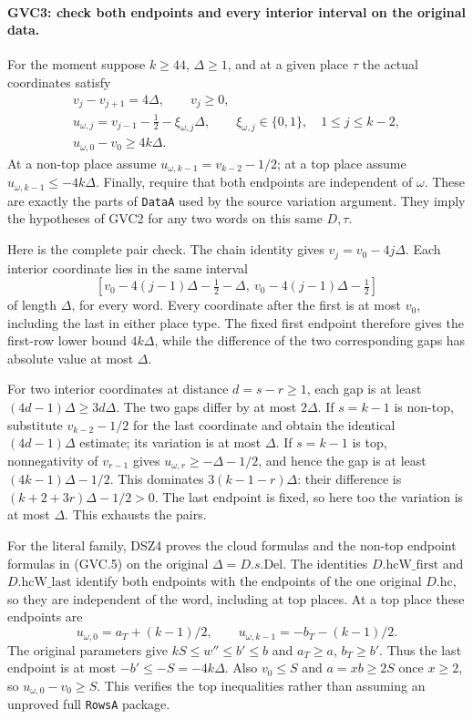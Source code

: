 \paragraph{GVC3: check both endpoints and every interior interval on the original data.}
\label{claim:GVC3}
For the moment suppose $k\ge44$, $\Delta\ge1$, and at a given
place $\tau$ the actual coordinates satisfy
\[
 \begin{gathered}
 v_j-v_{j+1}=4\Delta,\qquad v_j\ge0,\\
 u_{\omega,j}=v_{j-1}-\tfrac12-\xi_{\omega,j}\Delta,
 \qquad \xi_{\omega,j}\in\{0,1\},\quad1\le j\le k-2,\\
 u_{\omega,0}-v_0\ge4k\Delta.
 \end{gathered}                                               \tag{GVC.5}
\]
At a non-top place assume
$u_{\omega,k-1}=v_{k-2}-1/2$; at a top place assume
$u_{\omega,k-1}\le-4k\Delta$.
Finally, require that both endpoints are independent of $\omega$.
These are exactly the parts of \texttt{DataA} used by the source
variation argument. They imply the hypotheses of GVC2 for any two
words on this same $D,\tau$.

Here is the complete pair check. The chain identity gives
$v_j=v_0-4j\Delta$. Each interior coordinate lies in the same
interval
\[
 [v_0-4(j-1)\Delta-\tfrac12-\Delta,\
   v_0-4(j-1)\Delta-\tfrac12]
\]
of length $\Delta$, for every word. Every coordinate after the
first is at most $v_0$, including the last in either place type.
The fixed first endpoint therefore gives the first-row lower bound
$4k\Delta$, while the difference of the two corresponding gaps
has absolute value at most $\Delta$.

For two interior coordinates at distance $d=s-r\ge1$, each gap
is at least $(4d-1)\Delta\ge3d\Delta$.
The two gaps differ by at most $2\Delta$.
If $s=k-1$ is non-top, substitute
$v_{k-2}-1/2$ for the last coordinate and obtain the identical
$(4d-1)\Delta$ estimate; its variation is at most $\Delta$.
If $s=k-1$ is top, nonnegativity of $v_{r-1}$ gives
$u_{\omega,r}\ge-\Delta-1/2$, and hence the gap is at least
$(4k-1)\Delta-1/2$. This dominates
$3(k-1-r)\Delta$: their difference is
$(k+2+3r)\Delta-1/2>0$.
The last endpoint is fixed, so here too the variation is at most
$\Delta$. This exhausts the pairs.

For the literal family, DSZ4 proves the cloud formulas and the
non-top endpoint formulas in (GVC.5) on the original
$\Delta=D.s.\mathrm{Del}$. The identities
$D.\mathrm{hcW\_first}$ and $D.\mathrm{hcW\_last}$ identify both
endpoints with the endpoints of the one original $D.\mathrm{hc}$,
so they are independent of the word, including at top places.
At a top place these endpoints are
\[
 u_{\omega,0}=a_T+(k-1)/2,\qquad
 u_{\omega,k-1}=-b_T-(k-1)/2.
\]
The original parameters give $kS\le w''\le b'\le b$ and
$a_T\ge a$, $b_T\ge b'$. Thus the last endpoint is at most
$-b'\le-S=-4k\Delta$. Also $v_0\le S$ and
$a=xb\ge2S$ once $x\ge2$, so $u_{\omega,0}-v_0\ge S$.
This verifies the top inequalities rather than assuming an
unproved full \texttt{RowsA} package.

